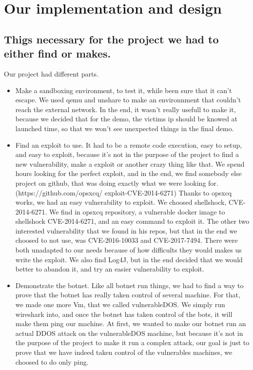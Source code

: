 \documentclass[../main.tex]{subfiles}
\begin{document}
	\chapter{Our implementation and design}


    \section{Thigs necessary for the project we had to either find or makes.}

    Our project had different parts.

    \begin{itemize}

        \item Make a sandboxing environment, to test it, while been sure that it can't escape. 
        We used qemu and unshare to make an environnment that couldn't reach the external network.
        In the end, it wasn't really usefull to make it, because we decided that for the demo, the victims ip should be knowed at launched time, so that we won't see unexpected things in the final demo. 

        \item Find an exploit to use. 
        It had to be a remote code execution, easy to setup, and easy to exploit, because it's not in the purpose of the project to find a new vulnerability, make a exploit or another crazy thing like that.
        We spend hours looking for the perfect exploit, and in the end, we find somebody else project on github, that was doing exactly what we were looking for.
        (https://github.com/opsxcq/
        exploit-CVE-2014-6271)
        Thanks to opsxcq works, we had an easy vulnerability to exploit.
        We choosed shellshock, CVE-2014-6271.
        We find in opsxcq repository, a vulnerable docker image to shellshock CVE-2014-6271, and an easy command to exploit it.
        The other two interested vulnerability that we found in his repos, but that in the end we choosed to not use, was CVE-2016-10033 and CVE-2017-7494.
        There were both unadapted to our needs because of how difficults they would makes us write the exploit.
        We also find Log4J, but in the end decided that we would better to abandon it, and try an easier vulnerability to exploit.

        \item Demonstrate the botnet.
        Like all botnet run things, we had to find a way to prove that the botnet has really taken control of several machine.
        For that, we made one more Vm, that we called vulnerableDOS. We simply run wireshark into, and once the botnet has taken control of the bots, it will make them ping our machine.
        At first, we wanted to make our botnet run an actual DDOS attack on the vulnerableDOS machine, but because it's not in the purpose of the project to make it run a complex attack, our goal is just to prove that we have indeed taken control of the vulnerables machines, we choosed to do only ping.

    \end{itemize}
\end{document}
